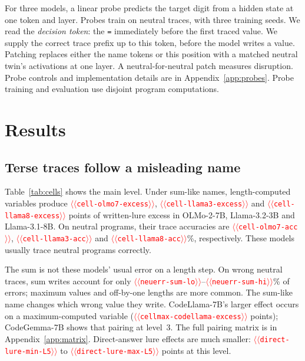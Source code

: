 \documentclass[11pt]{article}
\providecommand{\NUM}[1]{\textcolor{red}{$\langle\langle$\texttt{#1}$\rangle\rangle$}}
\providecommand{\tabinput}[1]{\IfFileExists{tables/#1.tex}{}{\textcolor{red}{[table \texttt{#1} not generated yet]}}}
\begin{document}
For three models, a linear probe predicts the target digit from a hidden state at one token
and layer. Probes train on neutral traces, with three training seeds. We read the \emph{decision token}: the \texttt{=} immediately before the
first traced value. We supply the correct trace prefix up to this token, before the model writes a value. Patching
replaces either the name tokens or this position with a matched neutral twin's activations at
one layer. A neutral-for-neutral patch measures disruption. Probe controls and implementation
details are in Appendix~\ref{app:probes}. Probe training and evaluation use disjoint program computations.

\section{Results}

\subsection{Terse traces follow a misleading name}

Table~\ref{tab:cells} shows the main level. Under sum-like names, length-computed variables
produce \NUM{cell-olmo7-excess}, \NUM{cell-llama3-excess} and \NUM{cell-llama8-excess} points
of written-lure excess in OLMo-2-7B, Llama-3.2-3B and Llama-3.1-8B. On neutral programs, their trace accuracies are \NUM{cell-olmo7-acc}, \NUM{cell-llama3-acc} and \NUM{cell-llama8-acc}\%,
respectively. These models usually trace neutral programs correctly.

The sum is not these models' usual error on a length step. On wrong neutral traces, sum writes
account for only \NUM{neuerr-sum-lo}--\NUM{neuerr-sum-hi}\% of errors; maximum values and
off-by-one lengths are more common. The sum-like name changes which wrong value they write.
CodeLlama-7B's larger effect occurs on a maximum-computed variable
(\NUM{cellmax-codellama-excess} points); CodeGemma-7B shows that pairing at level~3.
The full pairing matrix is in Appendix~\ref{app:matrix}. Direct-answer lure effects are much
smaller: \NUM{direct-lure-min-L5} to \NUM{direct-lure-max-L5} points at this level.

\begin{table}[t]
\centering\small
\tabinput{cells}
\caption{Level~5, means over three demonstration sets. \emph{Trace acc.}: neutral accuracy.
\emph{Direct: lure}: excess lure answers for the queried variable. The trace columns give
written-lure excess for length- or maximum-computed variables with sum-like names, with 95\%
bootstrap intervals. Effects are percentage points. $^{*}$ marks a consistent sign across
sets and an interval excluding zero.}
\label{tab:cells}
\end{table}
\end{document}
